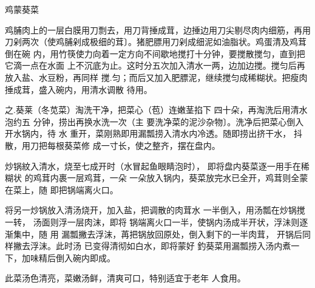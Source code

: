\begin{recipe}{鸡蒙葵菜}

\ingredients


\cooking

\step 鸡脯肉上的一层白膜用刀剽去，用刀背捶成茸，边捶边用刀尖剔尽肉内细筋，再用
刀剁两次（使鸡脯剁成极细的茸〕。猪肥膘用刀剁成细泥如油脂状。鸡蛋清及鸡茸倒在碗
内，用竹筷使力向着一定方向不间歇地搅打十分钟，要搅散搅匀，直到把它滴一点在水面
上不沉底为止。这时分五次加入清水一两，边加边搅。搅匀后再放入盐、水豆粉，再同样
搅.匀；而后又加入肥膘泥，继续搅匀成稀糊状。把瘦肉捶成茸，盛入碗内，用清水调散
待用。

之.葵莱（冬苋菜）淘洗干净，把菜心（苞）连嫩茎掐下 四十朵，再淘洗后用清水泡约五
分钟，捞出再换水洗一次（主 要洗净菜的泥沙杂物〕。洗净后把菜心倒入开水锅内，待
水 重开，菜刚熟即用漏瓢捞入清水内冷透。随即捞出挤干水， 抖散，用刀把每根葵菜修
成一寸长，使之整齐，摆在盘内。

炒锅紋入清水，烧至七成开时（水冒起鱼眼睛泡时）， 即将盘内葵菜逐一用手在稀糊状
的鸡茸内裹一层鸡茸，一朵 一朵放入锅内，葵菜放完水已全开，鸡茸则全蒙在菜上，随
即把锅端离火口。

将另一炒锅放入清汤烧开，加入盐，把调散的肉茸水 一半倒入，用汤瓢在炒锅搅一转，
汤面则浮一层肉沫，即将 锅端离火口一半，使锅内汤成半开状，浮沬则逐渐集中，随 用
漏瓢撇去浮沫，苒把锅放回原处，倒入剩下的一半肉茸， 开锅后同样撇去浮沫。此时汤
已变得清彻如白水，即将蒙好 釣葵菜用漏瓢捞入汤内煮一下，加味精后倒入碗内即成。

\features

此菜汤色清亮，菜嫩汤鲜，清爽可口，特别适宜于老年 人食用。

\end{recipe}

